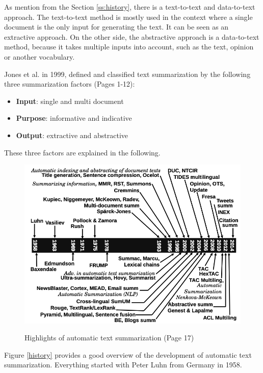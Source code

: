 As mention from the Section \ref{ss:history}, there is a text-to-text and data-to-text approach. The text-to-text method is mostly used in the context where a single document is the only input for generating the text. It can be seen as an extractive approach.  On the other side, the abstractive approach is a data-to-text method, because it takes multiple inputs into account, such as the text, opinion or another vocabulary.

Jones et al. in 1999, defined and classified text summarization by the following three summarization factors \cite{Jones98automaticsummarising:} (Pages 1-12):

\begin{itemize}
	\item \textbf{Input}: single and multi document
	\item \textbf{Purpose}: informative and indicative
	\item \textbf{Output}: extractive and abstractive
\end{itemize}

These three factors are explained in the following.

\begin{figure}
	\begin{center}
		\includegraphics[width=5.5in]{photos/history}\\
		\caption{Highlights of automatic text summarization \cite{juan} (Page 17)}\label{hist}
	\end{center}
\end{figure}

Figure \ref{history} provides a good overview of the development of automatic text summarization. Everything started with Peter Luhn from Germany in 1958.

